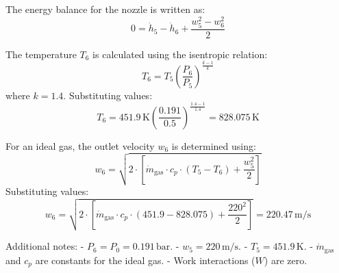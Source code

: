 The energy balance for the nozzle is written as:  
\[
0 = \dot{h}_5 - \dot{h}_6 + \frac{w_5^2 - w_6^2}{2}
\]  

The temperature \( T_6 \) is calculated using the isentropic relation:  
\[
T_6 = T_5 \left( \frac{P_6}{P_5} \right)^{\frac{k-1}{k}}
\]  
where \( k = 1.4 \). Substituting values:  
\[
T_6 = 451.9 \, \text{K} \left( \frac{0.191}{0.5} \right)^{\frac{1.4-1}{1.4}} = 828.075 \, \text{K}
\]  

For an ideal gas, the outlet velocity \( w_6 \) is determined using:  
\[
w_6 = \sqrt{2 \cdot \left[ \dot{m}_{\text{gas}} \cdot c_p \cdot (T_5 - T_6) + \frac{w_5^2}{2} \right]}
\]  
Substituting values:  
\[
w_6 = \sqrt{2 \cdot \left[ \dot{m}_{\text{gas}} \cdot c_p \cdot (451.9 - 828.075) + \frac{220^2}{2} \right]} = 220.47 \, \text{m/s}
\]  

Additional notes:  
- \( P_6 = P_0 = 0.191 \, \text{bar} \).  
- \( w_5 = 220 \, \text{m/s} \).  
- \( T_5 = 451.9 \, \text{K} \).  
- \( \dot{m}_{\text{gas}} \) and \( c_p \) are constants for the ideal gas.  
- Work interactions (\( W \)) are zero.